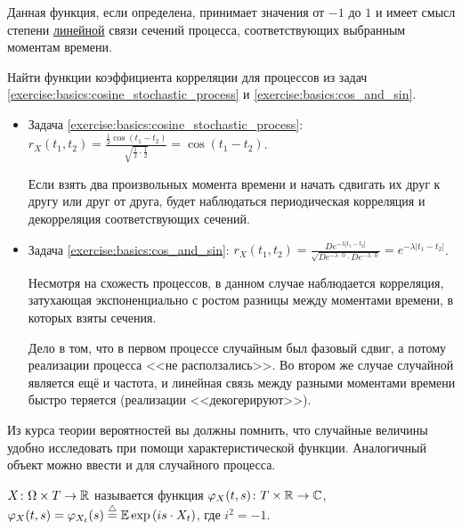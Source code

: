 Данная функция, если определена, принимает значения от $ -1 $ до $ 1 $
и имеет смысл степени \uline{линейной} связи сечений процесса,
соответствующих выбранным моментам времени.

\begin{Exercise}[counter=SecExercise, label={exercise:basics:correlation_coefficient_function}]
    \noindent
    Найти функции коэффициента корреляции для процессов из задач \ref{exercise:basics:cosine_stochastic_process} и \ref{exercise:basics:cos_and_sin}.
\end{Exercise}

\begin{Answer}
    \noindent
    \begin{itemize}
        \item
            Задача \ref{exercise:basics:cosine_stochastic_process}:
            $
                \displaystyle
                r_X(t_1, t_2) = \frac{\frac{1}{2} \cos(t_1 - t_2)}{\sqrt{\frac{1}{2} \cdot \frac{1}{2}}} = \cos(t_1 - t_2)
            $.

            Если взять два произвольных момента времени и начать сдвигать их друг к другу или друг от друга,
            будет наблюдаться периодическая корреляция и декорреляция соответствующих сечений.
        \item
            Задача \ref{exercise:basics:cos_and_sin}:
            $
                \displaystyle
                r_X(t_1, t_2) = \frac{D e^{-\lambda |t_1 - t_2|}}{\sqrt{D e^{-\lambda \cdot 0} \cdot D e^{-\lambda \cdot 0}}} = e^{-\lambda |t_1 - t_2|}
            $.

            Несмотря на схожесть процессов, в данном случае наблюдается корреляция,
            затухающая экспоненциально с ростом разницы между моментами времени,
            в которых взяты сечения.

            Дело в том, что в первом процессе случайным был фазовый сдвиг, а потому реализации процесса <<не расползались>>.
            Во втором же случае случайной является ещё и частота, и линейная связь между разными моментами времени быстро теряется
            (реализации <<декогерируют>>).
    \end{itemize}
\end{Answer}


Из курса теории вероятностей вы должны помнить,
что случайные величины удобно исследовать при помощи характеристической функции.
Аналогичный объект можно ввести и для случайного процесса.

\begin{definition}
    \label{definition:basics:characteristic_function}
     $ X \colon \Omega \times T \to \mathbb{R} $ называется функция
    $ \varphi_X(t, s) \colon T \times \mathbb{R} \to \mathbb{C} $, $ \varphi_X(t, s) = \varphi_{X_t}(s) \overset{\triangle}{=} \operatorname{\mathbb{E}} \exp \left( i s \cdot X_t \right) $,
    где $ i^2 = -1 $.
\end{definition}
